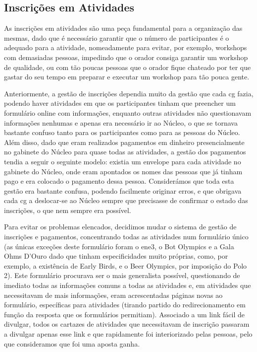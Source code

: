 
\subsection{Inscrições em Atividades}

As inscrições em atividades são uma peça fundamental para a organização das mesmas, dado que é necessário garantir que o número de participantes é o adequado para a atividade, nomeadamente para evitar, por exemplo, workshops com demasiadas pessoas, impedindo que o orador consiga garantir um workshop de qualidade, ou com tão poucas pessoas que o orador fique chateado por ter que gastar do seu tempo em preparar e executar um workshop para tão pouca gente.

Anteriormente, a gestão de inscrições dependia muito da gestão que cada \acrshort{cg} fazia, podendo haver atividades em que os participantes tinham que preencher um formulário online com informações, enquanto outras atividades não questionavam informações nenhumas e apenas era necessário ir ao Núcleo, o que se tornava bastante confuso tanto para os participantes como para as pessoas do Núcleo. Além disso, dado que eram realizados pagamentos em dinheiro presencialmente no gabinete do Núcleo para quase todas as atividades, a gestão dos pagamentos tendia a seguir o seguinte modelo: existia um envelope para cada atividade no gabinete do Núcleo, onde eram apontados os nomes das pessoas que já tinham pago e era colocado o pagamento dessa pessoa. Considerámos que toda esta gestão era bastante confusa, podendo facilmente originar erros, e que obrigava cada \acrshort{cg} a deslocar-se ao Núcleo sempre que precisasse de confirmar o estado das inscrições, o que nem sempre era possível.

Para evitar os problemas elencados, decidimos mudar o sistema de gestão de inscrições e pagamentos, concentrando todas as atividades num formulário único (as únicas exceções deste formulário foram o \acrshort{ene3}, o Bot Olympics e a Gala Ohms D'Ouro dado que tinham especificidades muito próprias, como, por exemplo, a existência de Early Birds, e o Beer Olympics, por imposição do Polo 2). Este formulário procurava ser o mais generalista possível, questionando de imediato todas as informações comuns a todas as atividades e, em atividades que necessitavam de mais informações, eram acrescentadas páginas novas ao formulário, específicas para atividades (tirando partido do redirecionamento em função da resposta que os formulários permitiam). Associado a um link fácil de divulgar, todos os cartazes de atividades que necessitavam de inscrição passaram a divulgar apenas esse link e que rapidamente foi interiorizado pelas pessoas, pelo que consideramos que foi uma aposta ganha.

